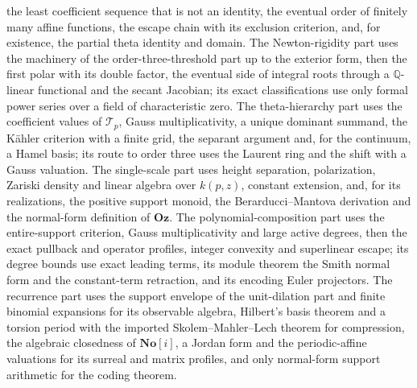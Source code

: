 \documentclass[11pt]{article}
\numberwithin{equation}{section}
\theoremstyle{definition}
\theoremstyle{remark}
\newcommand{\Q}{\mathbb Q}
\newcommand{\No}{\mathbf{No}}
\newcommand{\Oz}{\mathbf{Oz}}
\begin{document}
the least coefficient sequence that is not an identity, the eventual order of
finitely many affine functions, the escape chain with its exclusion
criterion, and, for existence, the partial theta identity and domain. The
Newton-rigidity part uses the machinery of the order-three-threshold part up
to the exterior form, then the first polar with its double factor, the
eventual side of integral roots through a $\Q$-linear functional and the
secant Jacobian; its exact classifications use only formal power series over a
field of characteristic zero. The theta-hierarchy part uses the coefficient
values of $\mathcal T_p$, Gauss multiplicativity, a unique dominant summand, the
K\"ahler criterion with a finite grid, the separant argument and, for the
continuum, a Hamel basis; its route to order three uses the Laurent ring and the
shift with a Gauss valuation. The single-scale part uses height separation,
polarization, Zariski density and linear algebra over $k(p,z)$, constant
extension, and, for its realizations, the positive support monoid, the
Berarducci--Mantova derivation and the normal-form definition of $\Oz$. The
polynomial-composition part uses the entire-support criterion, Gauss
multiplicativity and large active degrees, then the exact pullback and
operator profiles, integer convexity and superlinear escape; its degree bounds
use exact leading terms, its module theorem the Smith normal form and the
constant-term retraction, and its encoding Euler projectors. The recurrence
part uses the support envelope of the unit-dilation part and finite binomial
expansions for its observable algebra, Hilbert's basis theorem and a torsion
period with the imported Skolem--Mahler--Lech theorem for compression, the
algebraic closedness of $\No[i]$, a Jordan form and the periodic-affine
valuations for its surreal and matrix profiles, and only normal-form support
arithmetic for the coding theorem.
\end{document}
